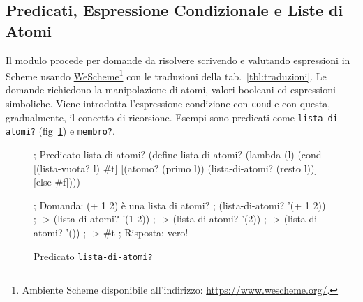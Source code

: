 \documentclass[withtimes]{easychair}
\begin{document}
%   
%
%   


\subsection{Predicati, Espressione Condizionale e Liste di Atomi}\label{atomi-operatori-predicati-e-liste-di-atomi}

Il modulo procede per domande da risolvere scrivendo e valutando espressioni in Scheme usando \href{https://www.wescheme.org/}{WeScheme}\footnote{Ambiente Scheme disponibile all'indirizzo: \url{https://www.wescheme.org/}.} con le traduzioni della tab.~\ref{tbl:traduzioni}. Le domande richiedono la manipolazione di atomi, valori booleani ed espressioni simboliche. Viene introdotta l'espressione condizione con \texttt{cond} e con questa, gradualmente, il concetto di ricorsione. Esempi sono predicati come \texttt{lista-di-atomi?} (fig~\ref{fig:lista-di-atomi?}) e \texttt{membro?}.

\begin{figure}[h]
  \centering
  \begin{pygmented}[lang=scheme]
; Predicato lista-di-atomi?
(define lista-di-atomi?
  (lambda (l)
    (cond
      [(lista-vuota? l) #t]
      [(atomo? (primo l)) (lista-di-atomi? (resto l))]
      [else #f])))

; Domanda: (+ 1 2) è una lista di atomi?
; (lista-di-atomi? '(+ 1 2))
; -> (lista-di-atomi? '(1 2))
; -> (lista-di-atomi? '(2))
; -> (lista-di-atomi? '())
; -> #t
; Risposta: vero!
  \end{pygmented}
  \caption{Predicato \texttt{lista-di-atomi?}}
  \label{fig:lista-di-atomi?}
\end{figure}

%
%
\end{document}
